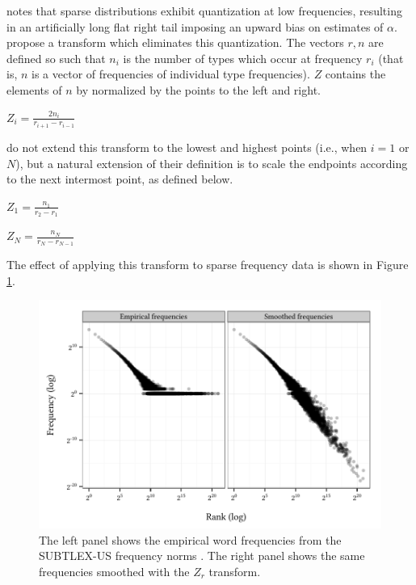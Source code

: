 \documentclass[12pt]{article}
\begin{document}
\citet{Good1953} notes that sparse distributions exhibit quantization at low frequencies, resulting in an artificially long flat right tail imposing an upward bias on estimates of $\alpha$. \citet[][29]{Church1991} propose a transform which eliminates this quantization. The vectors $r, n$ are defined so such that $n_i$ is the number of types which occur at frequency $r_i$ (that is, $n$ is a vector of frequencies of individual type frequencies). $Z$ contains the elements of $n$ by normalized by the points to the left and right.

\begin{unlabeledexample}
$\displaystyle Z_i = \frac{2 n_i}{r_{i + 1} - r_{i - 1}}$
\end{unlabeledexample}

\noindent \citeauthor{Church1991} do not extend this transform to the lowest and highest points (i.e., when $i = 1$ or $N$), but a natural extension of their definition is to scale the endpoints according to the next intermost point, as defined below.

\begin{unlabeledexample}
$\displaystyle Z_1 = \frac{n_1}{r_2 - r_1}$
\end{unlabeledexample}

\begin{unlabeledexample}
$\displaystyle Z_N = \frac{n_N}{r_N - r_{N - 1}}$
\end{unlabeledexample}

\noindent The effect of applying this transform to sparse frequency data is shown in Figure \ref{subtlex}.

\begin{figure}
\centering
\includegraphics{zr.pdf}
\caption{The left panel shows the empirical word frequencies from the SUBTLEX-US frequency norms \citep{Brysbaert2009}. The right panel shows the same frequencies smoothed with the $Z_r$ transform.}
\label{subtlex}
\end{figure}



\end{document}
